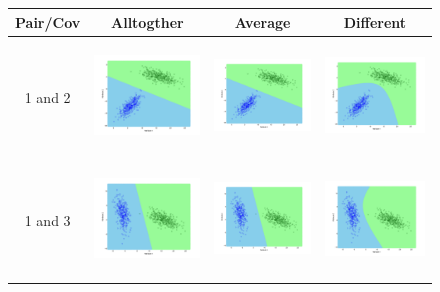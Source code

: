 \documentclass[a4paper]{article}
\begin{document}
			\begin{figure}
				\begin{tabular}{|c|c|c|c|}
					\hline
					Pair/Cov &  Alltogther & Average & Different	\\
					\hline
					1 and
					2&\includegraphics[width=40mm,height=30mm]{bayes/ls/pair/12/all_cov.png}&\includegraphics[width=40mm,height=30mm]{bayes/ls/pair/12/avg_cov.png}
					&\includegraphics[width=40mm,height=30mm]{bayes/ls/pair/12/diff_cov.png}\\
					\hline
					1 and
					3&\includegraphics[width=40mm,height=30mm]{bayes/ls/pair/13/all_cov.png}&\includegraphics[width=40mm,height=30mm]{bayes/ls/pair/13/all_cov.png}
					&\includegraphics[width=40mm,height=30mm]{bayes/ls/pair/13/diff_cov.png}\\

\end{tabular}
\end{figure}
\end{document}

